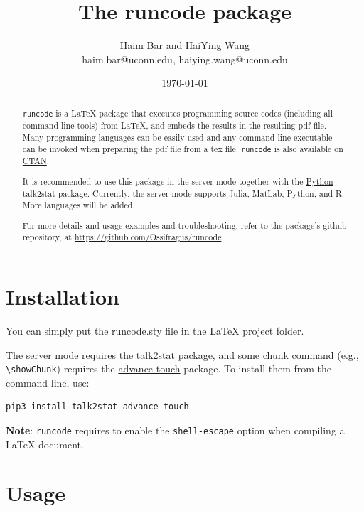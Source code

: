 \documentclass{ltxdoc}
\author{Haim Bar and HaiYing Wang \\haim.bar@uconn.edu, haiying.wang@uconn.edu}
\date{\today}
\title{The \textbf{runcode} package}
\begin{document}
\maketitle
\begin{abstract}

\texttt{runcode} is a \LaTeX{} package that executes programming source codes (including
all command line tools) from \LaTeX{}, and embeds the results in the resulting pdf
file. Many programming languages can be easily used and any command-line
executable can be invoked when preparing the pdf file from a tex file. \texttt{runcode}
is also available on \href{https://ctan.org/pkg/runcode}{CTAN}.

It is recommended to use this package in the server mode together with the
\href{https://www.python.org/}{Python} \href{https://pypi.org/project/talk2stat/}{talk2stat} package. Currently, the server mode supports \href{https://julialang.org/}{Julia}, \href{https://www.mathworks.com/products/matlab.html}{MatLab},
\href{https://www.python.org/}{Python}, and \href{https://www.r-project.org/}{R}. More languages will be added.

For more details and usage examples and troubleshooting, refer to the
package’s github repository, at \url{https://github.com/Ossifragus/runcode}.

\end{abstract}

\section{Installation}
\label{sec:org7b41ef7}
You can simply put the runcode.sty file in the \LaTeX{} project folder.

The server mode requires the \href{https://pypi.org/project/talk2stat/}{talk2stat} package, and some chunk command (e.g.,
\texttt{\textbackslash{}showChunk}) requires the \href{https://pypi.org/project/advance-touch/}{advance-touch} package. To install them from the
command line, use:

\begin{verbatim}
pip3 install talk2stat advance-touch
\end{verbatim}

\textbf{Note}: \texttt{runcode} requires to enable the \texttt{shell-escape} option when
compiling a \LaTeX{} document.


\section{Usage}
\label{sec:org5034faf}
\end{document}
